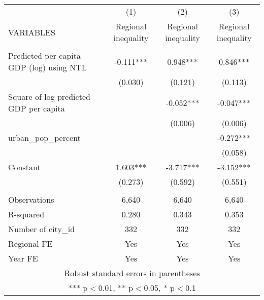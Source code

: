 \documentclass[]{article}
\begin{document}
\begin{tabular}{lccc} \hline
 & (1) & (2) & (3) \\
VARIABLES & Regional inequality & Regional inequality & Regional inequality \\ \hline
 &  &  &  \\
Predicted per capita GDP (log) using NTL & -0.111*** & 0.948*** & 0.846*** \\
 & (0.030) & (0.121) & (0.113) \\
Square of log predicted GDP per capita &  & -0.052*** & -0.047*** \\
 &  & (0.006) & (0.006) \\
urban\_pop\_percent &  &  & -0.272*** \\
 &  &  & (0.058) \\
Constant & 1.603*** & -3.717*** & -3.152*** \\
 & (0.273) & (0.592) & (0.551) \\
 &  &  &  \\
Observations & 6,640 & 6,640 & 6,640 \\
R-squared & 0.280 & 0.343 & 0.353 \\
Number of city\_id & 332 & 332 & 332 \\
Regional FE & Yes & Yes & Yes \\
 Year FE & Yes & Yes & Yes \\ \hline
\multicolumn{4}{c}{ Robust standard errors in parentheses} \\
\multicolumn{4}{c}{ *** p$<$0.01, ** p$<$0.05, * p$<$0.1} \\
\end{tabular}
\end{document}
